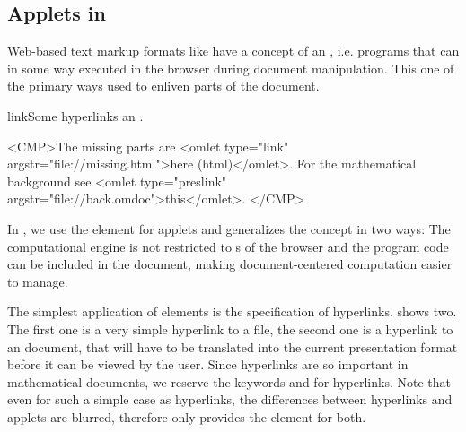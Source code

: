 \subsection{Applets in {\else{\omdoc}\fi}}\label{sec:applets}

Web-based text markup formats like {\html} have a concept of an
{}, i.e.  programs that can in some way executed in the browser
during document manipulation. This one of the primary ways used to enliven parts
of the document.
\begin{myfig}{link}{Some hyperlinks an {}.}\scriptsize
\begin{boxedverbatim}
<CMP>The missing parts are 
 <omlet type="link" argstr="file://missing.html">here (html)</omlet>.
  For the mathematical background see
 <omlet type="preslink" argstr="file://back.omdoc">this</omlet>.
</CMP>
\end{boxedverbatim}
\end{myfig}

In {\omdoc}, we use the {} element for applets and generalizes the
{} concept in two ways: The computational engine is not
restricted to {s} of the browser and the program code can be
included in the {\omdoc} document, making document-centered computation easier to
manage. 

The simplest application of {} elements is the specification of
hyperlinks. {} shows two. The first one is a very simple hyperlink
to a {\html} file, the second one is a hyperlink to an {\omdoc} document, that
will have to be translated into the current presentation format before it can be
viewed by the user. Since hyperlinks are so important in mathematical documents,
we reserve the keywords {} and
{} for hyperlinks. Note that even for such a simple
case as hyperlinks, the differences between hyperlinks and applets are blurred,
therefore {\omdoc} only provides the {} element for both.

